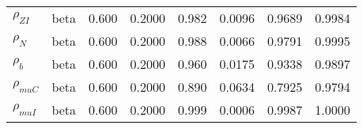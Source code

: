 \begin{center}
\begin{longtable}{llcccccc}
${\rho_{ZI}}$ & beta &   0.600 & 0.2000 &   0.982& 0.0096 &  0.9689 &  0.9984 \\ 
${\rho_N}$ & beta &   0.600 & 0.2000 &   0.988& 0.0066 &  0.9791 &  0.9995 \\ 
${\rho_b}$ & beta &   0.600 & 0.2000 &   0.960& 0.0175 &  0.9338 &  0.9897 \\ 
${\rho_{muC}}$ & beta &   0.600 & 0.2000 &   0.890& 0.0634 &  0.7925 &  0.9794 \\ 
${\rho_{muI}}$ & beta &   0.600 & 0.2000 &   0.999& 0.0006 &  0.9987 &  1.0000 \\ 
\end{longtable}
 \end{center}
